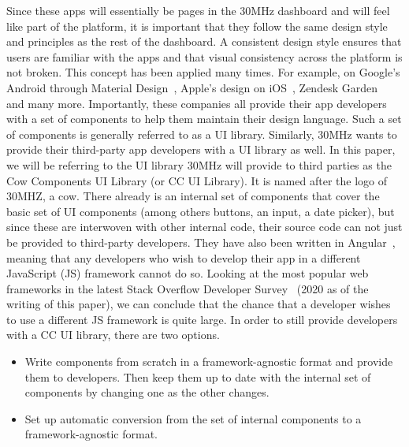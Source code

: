 Since these apps will essentially be pages in the 30MHz dashboard and will feel like part of the platform, it is important that they follow the same design style and principles as the rest of the dashboard. A consistent design style ensures that users are familiar with the apps and that visual consistency across the platform is not broken. This concept has been applied many times. For example, on Google's Android through Material Design~, Apple's design on iOS~, Zendesk Garden~ and many more. Importantly, these companies all provide their app developers with a set of components to help them maintain their design language. Such a set of components is generally referred to as a UI library.
Similarly, 30MHz wants to provide their third-party app developers with a UI library as well. In this paper, we will be referring to the UI library 30MHz will provide to third parties as the Cow Components UI Library (or CC UI Library). It is named after the logo of 30MHZ, a cow. There already is an internal set of components that cover the basic set of UI components (among others buttons, an input, a date picker), but since these are interwoven with other internal code, their source code can not just be provided to third-party developers. They have also been written in Angular~, meaning that any developers who wish to develop their app in a different JavaScript (JS) framework cannot do so. Looking at the most popular web frameworks in the latest Stack Overflow Developer Survey~ (2020 as of the writing of this paper), we can conclude that the chance that a developer wishes to use a different JS framework is quite large. In order to still provide developers with a CC UI library, there are two options.

\begin{itemize}
  \item Write components from scratch in a framework-agnostic format and provide them to developers. Then keep them up to date with the internal set of components by changing one as the other changes.
  \item Set up automatic conversion from the set of internal components to a framework-agnostic format.
\end{itemize}

